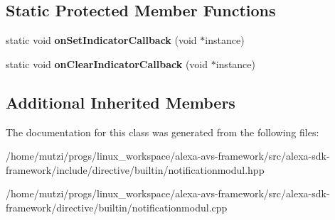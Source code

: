 \subsection*{Static Protected Member Functions}
\begin{DoxyCompactItemize}
\item 
\mbox{\label{classdirective_1_1NotificationModul_a22c33c13ffb69cd5b1e26763e5f8b6b9}} 
static void {\bfseries on\+Set\+Indicator\+Callback} (void $\ast$instance)
\item 
\mbox{\label{classdirective_1_1NotificationModul_a639471357524b0c0c836ff9d960cb6a6}} 
static void {\bfseries on\+Clear\+Indicator\+Callback} (void $\ast$instance)
\end{DoxyCompactItemize}
\subsection*{Additional Inherited Members}


The documentation for this class was generated from the following files\+:\begin{DoxyCompactItemize}
\item 
/home/mutzi/progs/linux\+\_\+workspace/alexa-\/avs-\/framework/src/alexa-\/sdk-\/framework/include/directive/builtin/notificationmodul.\+hpp\item 
/home/mutzi/progs/linux\+\_\+workspace/alexa-\/avs-\/framework/src/alexa-\/sdk-\/framework/directive/builtin/notificationmodul.\+cpp\end{DoxyCompactItemize}
